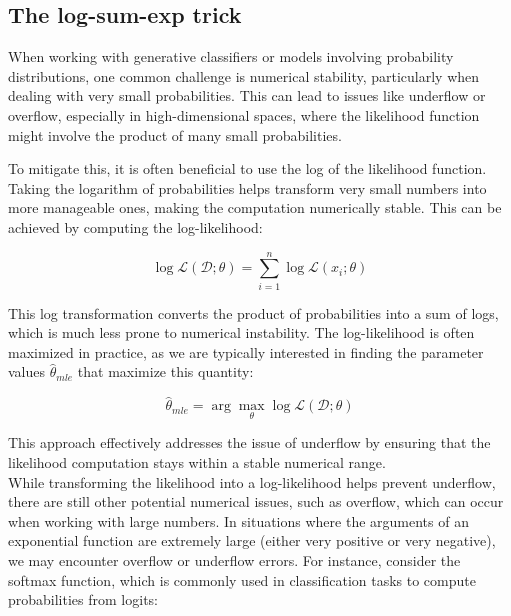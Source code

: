 \documentclass[12pt, a4paper]{article}
\theoremstyle{definition}
\numberwithin{figure}{section}
\numberwithin{equation}{section}
\numberwithin{table}{section}
\begin{document}

\subsection{The log-sum-exp trick}
When working with generative classifiers or models involving probability distributions, one common challenge is numerical stability, particularly when dealing with very small probabilities. This can lead to issues like underflow or overflow, especially in high-dimensional spaces, where the likelihood function might involve the product of many small probabilities.

To mitigate this, it is often beneficial to use the log of the likelihood function. Taking the logarithm of probabilities helps transform very small numbers into more manageable ones, making the computation numerically stable. This can be achieved by computing the log-likelihood:

\begin{equation}
\log \mathcal{L}(\mathcal{D};\theta) = \sum_{i=1}^{n} \log \mathcal{L}(x_i;\theta)
\end{equation}

This log transformation converts the product of probabilities into a sum of logs, which is much less prone to numerical instability. The log-likelihood is often maximized in practice, as we are typically interested in finding the parameter values $\hat{\theta}_{mle}$ that maximize this quantity:

\begin{equation}
\hat{\theta}_{mle} = \arg \max_{\theta} \log \mathcal{L}(\mathcal{D};\theta)
\end{equation}

This approach effectively addresses the issue of underflow by ensuring that the likelihood computation stays within a stable numerical range.\\

While transforming the likelihood into a log-likelihood helps prevent underflow, there are still other potential numerical issues, such as overflow, which can occur when working with large numbers. In situations where the arguments of an exponential function are extremely large (either very positive or very negative), we may encounter overflow or underflow errors. For instance, consider the softmax function, which is commonly used in classification tasks to compute probabilities from logits:
\end{document}
